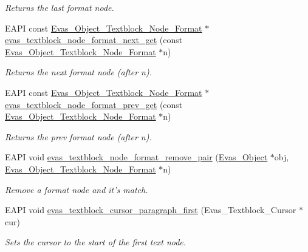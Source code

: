 \begin{DoxyCompactItemize}
\begin{DoxyCompactList}\small\item\em Returns the last format node. \item\end{DoxyCompactList}\item 
EAPI const \hyperlink{Evas_8h_adcd2409468741c89d607f06e17da1f64}{Evas\_\-Object\_\-Textblock\_\-Node\_\-Format} $\ast$ \hyperlink{group__Evas__Object__Textblock_ga341e85b5bb0c9b2c82db4eb5a2432a9d}{evas\_\-textblock\_\-node\_\-format\_\-next\_\-get} (const \hyperlink{Evas_8h_adcd2409468741c89d607f06e17da1f64}{Evas\_\-Object\_\-Textblock\_\-Node\_\-Format} $\ast$n)
\begin{DoxyCompactList}\small\item\em Returns the next format node (after n). \item\end{DoxyCompactList}\item 
EAPI const \hyperlink{Evas_8h_adcd2409468741c89d607f06e17da1f64}{Evas\_\-Object\_\-Textblock\_\-Node\_\-Format} $\ast$ \hyperlink{group__Evas__Object__Textblock_ga8566bfff8ca71cc89cf704c9a082780c}{evas\_\-textblock\_\-node\_\-format\_\-prev\_\-get} (const \hyperlink{Evas_8h_adcd2409468741c89d607f06e17da1f64}{Evas\_\-Object\_\-Textblock\_\-Node\_\-Format} $\ast$n)
\begin{DoxyCompactList}\small\item\em Returns the prev format node (after n). \item\end{DoxyCompactList}\item 
EAPI void \hyperlink{group__Evas__Object__Textblock_gab53e3b12b9332180ad6736100333eb71}{evas\_\-textblock\_\-node\_\-format\_\-remove\_\-pair} (\hyperlink{group__Evas__Object__Group_ga9e19e6dd1f517a0ba437c0114d3e7c97}{Evas\_\-Object} $\ast$obj, \hyperlink{Evas_8h_adcd2409468741c89d607f06e17da1f64}{Evas\_\-Object\_\-Textblock\_\-Node\_\-Format} $\ast$n)
\begin{DoxyCompactList}\small\item\em Remove a format node and it's match. \item\end{DoxyCompactList}\item 
EAPI void \hyperlink{group__Evas__Object__Textblock_ga445a498191535460cf6de442cb2b3a41}{evas\_\-textblock\_\-cursor\_\-paragraph\_\-first} (Evas\_\-Textblock\_\-Cursor $\ast$cur)
\begin{DoxyCompactList}\small\item\em Sets the cursor to the start of the first text node. \item\end{DoxyCompactList}\item 

\end{DoxyCompactItemize}
